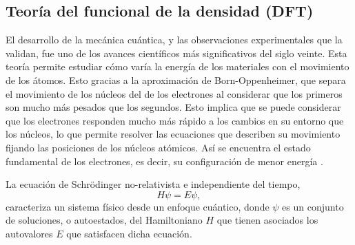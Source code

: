 \subsection{Teoría del funcional de la densidad (DFT)}

El desarrollo de la mecánica cuántica, y las observaciones experimentales que la
validan, fue uno de los avances científicos más significativos del siglo veinte. 
Esta teoría permite estudiar cómo varía la energía de los materiales con el 
movimiento de los átomos. Esto gracias a la aproximación de Born-Oppenheimer, que 
separa el movimiento de los núcleos del de los electrones al considerar que los primeros son mucho más
pesados que los segundos. Esto implica que se puede considerar que los electrones 
responden mucho más rápido a los cambios en su entorno que los núcleos, lo que 
permite resolver las ecuaciones que describen su movimiento fijando las 
posiciones de los núcleos atómicos. Así se encuentra el estado fundamental de los
electrones, es decir, su configuración de menor energía \cite{shankar2012}.

La ecuación de Schrödinger no-relativista e independiente del tiempo,
\begin{equation}\label{eq:schrodinger}
    H \psi = E \psi,
\end{equation}
caracteriza un sistema físico desde un enfoque cuántico, donde $\psi$ es un
conjunto de soluciones, o autoestados, del Hamiltoniano $H$ que tienen asociados los
autovalores $E$ que satisfacen dicha ecuación. 

